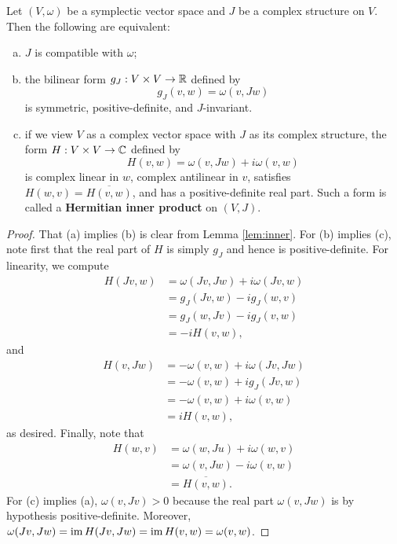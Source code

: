 \documentclass{amsart}
\begin{document}
\begin{lemma}
    Let $(V,\omega)$ be a symplectic vector space and $J$ be a complex structure on $V$.
    Then the following are equivalent:
    \begin{enumerate}[(a)]
        \item $J$ is compatible with $\omega$;
        \item the bilinear form $g_J:V\times V\to\mathbb{R}$ defined by
            \begin{equation*}
                g_J(v,w)=\omega(v,Jw)
            \end{equation*}
            is symmetric, positive-definite, and $J$-invariant.
        \item if we view $V$ as a complex vector space with $J$ as its complex structure,
            the form $H:V\times V\to\mathbb{C}$ defined by
            \begin{equation*}
                H(v,w) = \omega(v,Jw)+i\omega(v,w)
            \end{equation*}
            is complex linear in $w$, complex antilinear in $v$, satisfies $H(w,v)=\overline{H(v,w)}$,
            and has a positive-definite real part. Such a form is called a \textbf{Hermitian inner product}
            on $(V,J)$.
    \end{enumerate}
\end{lemma}
\begin{proof}
    That (a) implies (b) is clear from Lemma \ref{lem:inner}. For (b) implies (c), note first
    that the real part of $H$ is simply $g_J$ and hence is positive-definite. For linearity,
    we compute
    \begin{align*}
        H(Jv,w) &= \omega(Jv,Jw) + i\omega(Jv,w)\\
        &= g_J(Jv,w) - ig_J(w,v)\\
        &= g_J(w,Jv) - ig_J(v,w)\\
        &= -i H(v,w),
    \end{align*}
    and
    \begin{align*}
        H(v,Jw) &= -\omega(v,w) + i\omega(Jv,Jw)\\
        &= -\omega(v,w)+ig_J(Jv,w)\\
        &= -\omega(v,w)+i\omega(v,w)\\
        &= iH(v,w),
    \end{align*}
    as desired. Finally, note that
    \begin{align*}
        H(w,v) &= \omega(w,Ju)+i\omega(w,v)\\
        &= \omega(v,Jw)-i\omega(v,w)\\
        &= \overline{H(v,w)}.
    \end{align*}
    For (c) implies (a), $\omega(v,Jv)>0$ because the real part $\omega(v,Jw)$ is by hypothesis
    positive-definite. Moreover, $\omega(Jv,Jw)=\operatorname{im} H(Jv,Jw)=\operatorname{im} H(v,w)=\omega(v,w)$.
\end{proof}
\end{document}
